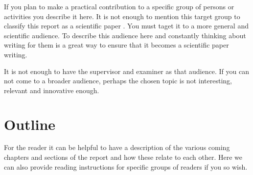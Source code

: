 If you plan to make a practical contribution to a specific group of persons or activities you describe it here. It is not enough to mention this target group to classify this report as a scientific paper . You must taget it to a more general and scientific audience. To describe this audience here and constantly thinking about writing for them is a great way to ensure that it becomes a scientific paper writing.

It is not enough to have the supervisor and examiner as that audience. If you can not come to a broader audience, perhaps the  chosen topic is not interesting, relevant and innovative enough.

\section{Outline}
For the reader it can be helpful to have a description of the various coming chapters and sections of the report and how these relate to each other. Here we can also provide reading instructions for specific groups of readers if you so wish.
